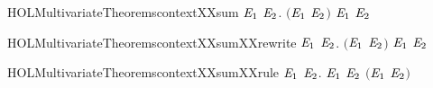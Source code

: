 \newcommand{\HOLMultivariateTheoremscontextXXrules}{\UseVerbatim{HOLMultivariateTheoremscontextXXrules}}
\begin{SaveVerbatim}{HOLMultivariateTheoremscontextXXsum}
\HOLTokenTurnstile{} \HOLSymConst{\HOLTokenForall{}} \ensuremath{\HOLBoundVar{E}\sb{\mathrm{1}}} \ensuremath{\HOLBoundVar{E}\sb{\mathrm{2}}}.
         \ensuremath{(}\ensuremath{\HOLBoundVar{E}\sb{\mathrm{1}}} \HOLSymConst{\ensuremath{+}} \ensuremath{\HOLBoundVar{E}\sb{\mathrm{2}}}\ensuremath{)} \HOLSymConst{\HOLTokenImp{}}   \ensuremath{\HOLBoundVar{E}\sb{\mathrm{1}}} \HOLSymConst{\HOLTokenConj{}}   \ensuremath{\HOLBoundVar{E}\sb{\mathrm{2}}}
\end{SaveVerbatim}
\newcommand{\HOLMultivariateTheoremscontextXXsum}{\UseVerbatim{HOLMultivariateTheoremscontextXXsum}}
\begin{SaveVerbatim}{HOLMultivariateTheoremscontextXXsumXXrewrite}
\HOLTokenTurnstile{} \HOLSymConst{\HOLTokenForall{}} \ensuremath{\HOLBoundVar{E}\sb{\mathrm{1}}} \ensuremath{\HOLBoundVar{E}\sb{\mathrm{2}}}.
         \ensuremath{(}\ensuremath{\HOLBoundVar{E}\sb{\mathrm{1}}} \HOLSymConst{\ensuremath{+}} \ensuremath{\HOLBoundVar{E}\sb{\mathrm{2}}}\ensuremath{)} \HOLSymConst{\HOLTokenEquiv{}}   \ensuremath{\HOLBoundVar{E}\sb{\mathrm{1}}} \HOLSymConst{\HOLTokenConj{}}   \ensuremath{\HOLBoundVar{E}\sb{\mathrm{2}}}
\end{SaveVerbatim}
\newcommand{\HOLMultivariateTheoremscontextXXsumXXrewrite}{\UseVerbatim{HOLMultivariateTheoremscontextXXsumXXrewrite}}
\begin{SaveVerbatim}{HOLMultivariateTheoremscontextXXsumXXrule}
\HOLTokenTurnstile{} \HOLSymConst{\HOLTokenForall{}} \ensuremath{\HOLBoundVar{E}\sb{\mathrm{1}}} \ensuremath{\HOLBoundVar{E}\sb{\mathrm{2}}}.
         \ensuremath{\HOLBoundVar{E}\sb{\mathrm{1}}} \HOLSymConst{\HOLTokenConj{}}   \ensuremath{\HOLBoundVar{E}\sb{\mathrm{2}}} \HOLSymConst{\HOLTokenImp{}}   \ensuremath{(}\ensuremath{\HOLBoundVar{E}\sb{\mathrm{1}}} \HOLSymConst{\ensuremath{+}} \ensuremath{\HOLBoundVar{E}\sb{\mathrm{2}}}\ensuremath{)}
\end{SaveVerbatim}
\newcommand{\HOLMultivariateTheoremscontextXXsumXXrule}{\UseVerbatim{HOLMultivariateTheoremscontextXXsumXXrule}}
